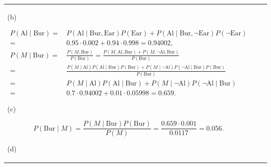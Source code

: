 \documentclass[10pt]{book}
\begin{document}
\begin{center}
\begin{tabular}{|l|l|l|}
(b)

$$
\begin{aligned}
P(\text{Al} \mid \text{Bur})= & \, P(\text{Al} \mid \text{Bur}, \text{Ear}) P(\text{Ear})+P(\text{Al} \mid \text{Bur}, \neg \text{Ear}) P(\neg \text{Ear}) \\
= & \, 0.95 \cdot 0.002+0.94 \cdot 0.998=0.94002, \\
P(M \mid \text{Bur})= & \, \frac{P(M, \text{Bur})}{P(\text{Bur})}=\frac{P(M, \text{Al}, \text{Bur})+P(M, \neg \text{Al}, \text{Bur})}{P(\text{Bur})} \\
= & \, \frac{P(M \mid \text{Al}) P(\text{Al} \mid \text{Bur}) P(\text{Bur})+P(M \mid \neg \text{Al}) P(\neg \text{Al} \mid \text{Bur}) P(\text{Bur})}{P(\text{Bur})} \\
= & \, P(M \mid \text{Al}) P(\text{Al} \mid \text{Bur})+P(M \mid \neg \text{Al}) P(\neg \text{Al} \mid \text{Bur}) \\
= & \, 0.7 \cdot 0.94002+0.01 \cdot 0.05998=0.659.
\end{aligned}
$$

(c)

$$
P(\text{Bur} \mid M)=\frac{P(M \mid \text{Bur}) P(\text{Bur})}{P(M)}=\frac{0.659 \cdot 0.001}{0.0117}=0.056.
$$

(d)


\end{tabular}
\end{center}
\end{document}
